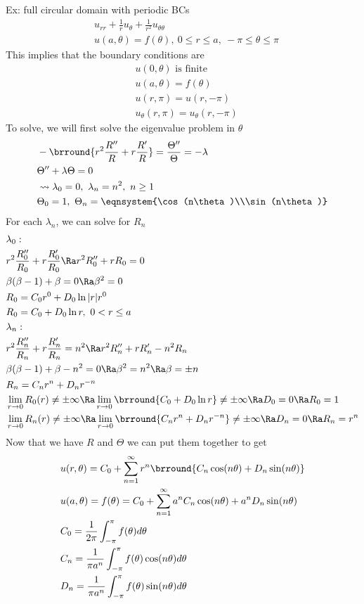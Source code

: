 Ex: full circular domain with periodic BCs
\begin{align*}
    &u_{rr}+\frac{1}{r}u_\theta+\frac{1}{r^2}u_{\theta\theta}\\
    &u(a,\theta)=f(\theta),\ 0\leq r\leq a,\ -\pi\leq\theta\leq\pi
\end{align*}
This implies that the boundary conditions are
\begin{align*}
    &u(0,\theta)\text{ is finite}\\
    &u(a,\theta)=f(\theta)\\
    &u(r,\pi)=u(r,-\pi)\\
    &u_\theta(r,\pi)=u_\theta(r,-\pi)
\end{align*}
To solve, we will first solve the eigenvalue problem in $\theta$
\begin{align*}
    &-\brround{r^2\frac{R''}{R}+r\frac{R'}{R}}=\frac{\Theta''}{\Theta}=-\lambda\\
    &\Theta''+\lambda\Theta=0\\
    &\leadsto \lambda_0=0,\ \lambda_n=n^2,\ n\geq1\\
    &\Theta_0=1,\ \Theta_n=\eqnsystem{\cos(n\theta)\\\sin(n\theta)}
\end{align*}
For each $\lambda_n$, we can solve for $R_n$
\begin{align*}
    &\lambda_0:\\
    &r^2\frac{R_0''}{R_0}+r\frac{R_0'}{R_0}\Ra r^2R_0''+rR_0=0\\
    &\beta(\beta-1)+\beta=0\Ra \beta^2=0\\
    &R_0=C_0r^0+D_0\ln|r|r^0\\
    &R_0=C_0+D_0\ln r,\ 0<r\leq a\\
    &\lambda_n:\\
    &r^2\frac{R_n''}{R_n}+r\frac{R_n'}{R_n}=n^2\Ra r^2R_n''+rR_n'-n^2R_n\\
    &\beta(\beta-1)+\beta-n^2=0\Ra \beta^2=n^2\Ra \beta=\pm n\\
    &R_n=C_nr^n+D_nr^{-n}\\
    &\lim_{r\to0} R_0(r)\neq\pm\infty\Ra \lim_{r\to0}\brround{C_0+D_0\ln r}\neq\pm\infty\Ra D_0=0\Ra R_0=1\\
    &\lim_{r\to0} R_n(r)\neq\pm\infty\Ra \lim_{r\to0}\brround{C_nr^n+D_nr^{-n}}\neq\pm\infty\Ra D_n=0\Ra R_n=r^n
\end{align*}
Now that we have $R$ and $\Theta$ we can put them together to get
\begin{align*}
    &u(r,\theta)=C_0+\sum_{n=1}^\infty r^n\brround{C_n\cos(n\theta)+D_n\sin(n\theta)}\\
    &u(a,\theta)=f(\theta)=C_0+\sum_{n=1}^\infty a^nC_n\cos(n\theta)+a^nD_n\sin(n\theta)\\
    &C_0=\frac{1}{2\pi}\int_{-\pi}^\pi f(\theta)d\theta\\
    &C_n=\frac{1}{\pi a^n}\int_{-\pi}^\pi f(\theta)\cos(n\theta)d\theta\\
    &D_n=\frac{1}{\pi a^n}\int_{-\pi}^\pi f(\theta)\sin(n\theta)d\theta
\end{align*}
